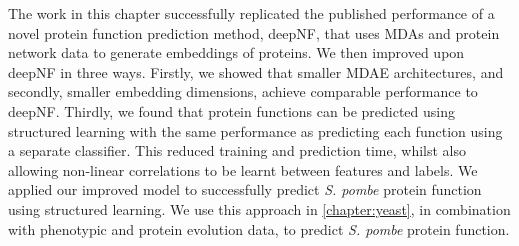 The work in this chapter successfully replicated the published performance of a novel protein function prediction method, deepNF, that uses MDAs and protein network data to generate embeddings of proteins.
We then improved upon deepNF in three ways.
Firstly, we showed that smaller MDAE architectures, and secondly, smaller embedding dimensions, achieve comparable performance to deepNF.
Thirdly, we found that protein functions can be predicted using structured learning with the same performance as predicting each function using a separate classifier.
This reduced training and prediction time, whilst also allowing non-linear correlations to be learnt between features and labels.
We applied our improved model to successfully predict \emph{S. pombe} protein function using structured learning.
We use this approach in \ref{chapter:yeast}, in combination with phenotypic and protein evolution data, to predict \emph{S. pombe} protein function.

